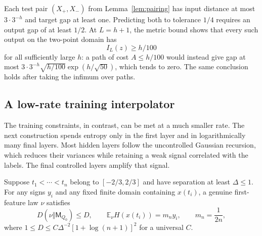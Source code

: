Each test pair $(X_+,X_-)$ from Lemma~\ref{lem:pairing} has
input distance at most $3\cdot3^{-h}$ and target gap at least one.
Predicting both to tolerance $1/4$ requires an output gap of at least
$1/2$. At $L=h+1$, the metric bound shows that every such output on
the two-point domain has
\begin{equation}\label{eq:critical-correct-pair-rate}
 I_L(z)\ge h/100
\end{equation}
for all sufficiently large $h$: a path of cost $A\le h/100$ would
instead give gap at most
$3\cdot3^{-h}\sqrt{h/100}\exp(h/\sqrt{50})$, which tends to zero.
The same conclusion holds after taking the infimum over paths.

\subsection{A low-rate training interpolator}

The training constraints, in contrast, can be met at a much smaller
rate. The next construction spends entropy only in the first layer and
in logarithmically many final layers. Most hidden layers follow the
uncontrolled Gaussian recursion, which reduces their variances while
retaining a weak signal correlated with the labels. The final controlled
layers amplify that signal.

\begin{lemma}
\label{lem:critical-mean-seed-depth}
Suppose $t_1<\cdots<t_n$ belong to $[-2/3,2/3]$ and have
separation at least $\Delta\le1$. For any signs $y_i$ and any fixed
finite domain containing $x(t_i)$, a genuine first-feature law $\nu$
satisfies
\[
 D(\nu\Vert\mathsf M_{Q_0})\le D,\qquad
 \mathbb E_\nu H(x(t_i))=m_n y_i,\qquad m_n=\frac1{2n},
\]
where $1\le D\le C\Delta^{-2}[1+\log(n+1)]^2$ for a universal $C$.
\end{lemma}

